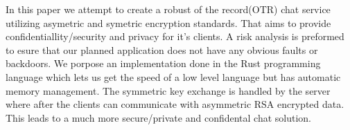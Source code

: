 In this paper we attempt to create a robust of the record(OTR) chat
service utilizing asymetric and symetric encryption standards. That
aims to provide confidentiallity/security and privacy for it's
clients. A risk analysis is preformed to esure that our planned
application does not have any obvious faults or backdoors. We porpose an
implementation done in the Rust programming language which lets us
get the speed of a low level language but has automatic memory
management. The symmetric key exchange is handled by the server where
after the clients can communicate with asymmetric RSA encrypted data.
This leads to a much more secure/private and confidental chat solution.
